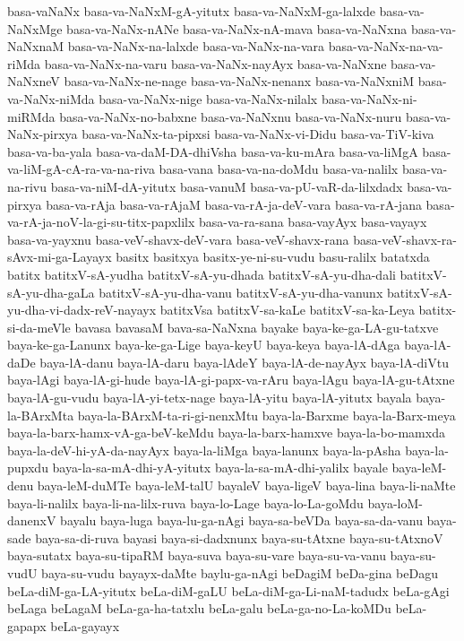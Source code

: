 {basa-vaNaNx
basa-va-NaNxM-gA-yitutx
basa-va-NaNxM-ga-lalxde
basa-va-NaNxMge
basa-va-NaNx-nANe
basa-va-NaNx-nA-mava
basa-va-NaNxna
basa-va-NaNxnaM
basa-va-NaNx-na-lalxde
basa-va-NaNx-na-vara
basa-va-NaNx-na-va-riMda
basa-va-NaNx-na-varu
basa-va-NaNx-nayAyx
basa-va-NaNxne
basa-va-NaNxneV
basa-va-NaNx-ne-nage
basa-va-NaNx-nenanx
basa-va-NaNxniM
basa-va-NaNx-niMda
basa-va-NaNx-nige
basa-va-NaNx-nilalx
basa-va-NaNx-ni-miRMda
basa-va-NaNx-no-babxne
basa-va-NaNxnu
basa-va-NaNx-nuru
basa-va-NaNx-pirxya
basa-va-NaNx-ta-pipxsi
basa-va-NaNx-vi-Didu
basa-va-TiV-kiva
basa-va-ba-yala
basa-va-daM-DA-dhiVsha
basa-va-ku-mAra
basa-va-liMgA
basa-va-liM-gA-cA-ra-va-na-riva
basa-vana
basa-va-na-doMdu
basa-va-nalilx
basa-va-na-rivu
basa-va-niM-dA-yitutx
basa-vanuM
basa-va-pU-vaR-da-lilxdadx
basa-va-pirxya
basa-va-rAja
basa-va-rAjaM
basa-va-rA-ja-deV-vara
basa-va-rA-jana
basa-va-rA-ja-noV-la-gi-su-titx-papxlilx
basa-va-ra-sana
basa-vayAyx
basa-vayayx
basa-va-yayxnu
basa-veV-shavx-deV-vara
basa-veV-shavx-rana
basa-veV-shavx-ra-sAvx-mi-ga-Layayx
basitx
basitxya
basitx-ye-ni-su-vudu
basu-ralilx
batatxda
batitx
batitxV-sA-yudha
batitxV-sA-yu-dhada
batitxV-sA-yu-dha-dali
batitxV-sA-yu-dha-gaLa
batitxV-sA-yu-dha-vanu
batitxV-sA-yu-dha-vanunx
batitxV-sA-yu-dha-vi-dadx-reV-nayayx
batitxVsa
batitxV-sa-kaLe
batitxV-sa-ka-Leya
batitx-si-da-meVle
bavasa
bavasaM
bava-sa-NaNxna
bayake
baya-ke-ga-LA-gu-tatxve
baya-ke-ga-Lanunx
baya-ke-ga-Lige
baya-keyU
baya-keya
baya-lA-dAga
baya-lA-daDe
baya-lA-danu
baya-lA-daru
baya-lAdeY
baya-lA-de-nayAyx
baya-lA-diVtu
baya-lAgi
baya-lA-gi-hude
baya-lA-gi-papx-va-rAru
baya-lAgu
baya-lA-gu-tAtxne
baya-lA-gu-vudu
baya-lA-yi-tetx-nage
baya-lA-yitu
baya-lA-yitutx
bayala
baya-la-BArxMta
baya-la-BArxM-ta-ri-gi-nenxMtu
baya-la-Barxme
baya-la-Barx-meya
baya-la-barx-hamx-vA-ga-beV-keMdu
baya-la-barx-hamxve
baya-la-bo-mamxda
baya-la-deV-hi-yA-da-nayAyx
baya-la-liMga
baya-lanunx
baya-la-pAsha
baya-la-pupxdu
baya-la-sa-mA-dhi-yA-yitutx
baya-la-sa-mA-dhi-yalilx
bayale
baya-leM-denu
baya-leM-duMTe
baya-leM-talU
bayaleV
baya-ligeV
baya-lina
baya-li-naMte
baya-li-nalilx
baya-li-na-lilx-ruva
baya-lo-Lage
baya-lo-La-goMdu
baya-loM-danenxV
bayalu
baya-luga
baya-lu-ga-nAgi
baya-sa-beVDa
baya-sa-da-vanu
baya-sade
baya-sa-di-ruva
bayasi
baya-si-dadxnunx
baya-su-tAtxne
baya-su-tAtxnoV
baya-sutatx
baya-su-tipaRM
baya-suva
baya-su-vare
baya-su-va-vanu
baya-su-vudU
baya-su-vudu
bayayx-daMte
baylu-ga-nAgi
beDagiM
beDa-gina
beDagu
beLa-diM-ga-LA-yitutx
beLa-diM-gaLU
beLa-diM-ga-Li-naM-tadudx
beLa-gAgi
beLaga
beLagaM
beLa-ga-ha-tatxlu
beLa-galu
beLa-ga-no-La-koMDu
beLa-gapapx
beLa-gayayx
}
